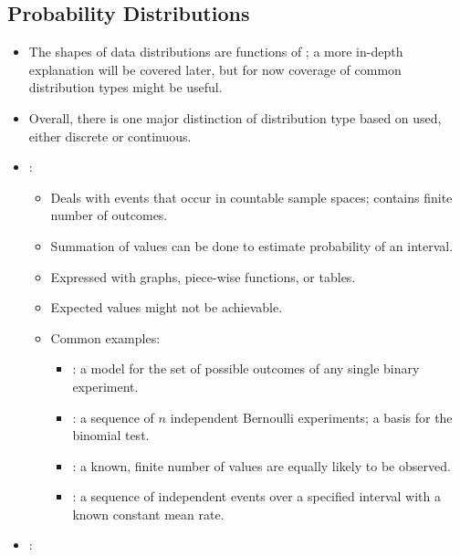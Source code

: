 \begin{itemize}
  \subsection{Probability Distributions}
  \begin{itemize}
    \item The shapes of data distributions are functions of \hyperref[Chapter: Probability Theory]{}; a more in-depth explanation will be covered later, but for now coverage of common distribution types might be useful.
    \item Overall, there is one major distinction of distribution type based on \hyperref[Subsection: Data Types]{} used, either discrete or continuous.
    \item {}:
      \begin{itemize}
        \item Deals with events that occur in countable sample spaces; contains finite number of outcomes.
        \item Summation of values can be done to estimate probability of an interval.
        \item Expressed with graphs, piece-wise functions, or tables.
        \item Expected values might not be achievable.
        \item Common examples:
        \begin{multicols}{2}
        \begin{itemize}
          \item {}: a model for the set of possible outcomes of any single binary experiment.
          \item {}: a sequence of \(n\) independent Bernoulli experiments; a basis for the binomial test.
          \item {}: a known, finite number of values are equally likely to be observed.
          \item {}: a sequence of independent events over a specified interval with a known constant mean rate.
        \end{itemize}
        \end{multicols}
      \end{itemize}
      \item {}: 

\end{itemize}
\end{itemize}
